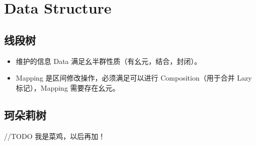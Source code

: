 \section{Data Structure}

\subsection{线段树}
\begin{itemize}
    \item 维护的信息 Data 满足幺半群性质（有幺元，结合，封闭）。
    \item Mapping 是区间修改操作，必须满足可以进行 Composition（用于合并 Lazy 标记），Mapping 需要存在幺元。
\end{itemize}




\subsection{珂朵莉树}

//TODO
我是菜鸡，以后再加！
